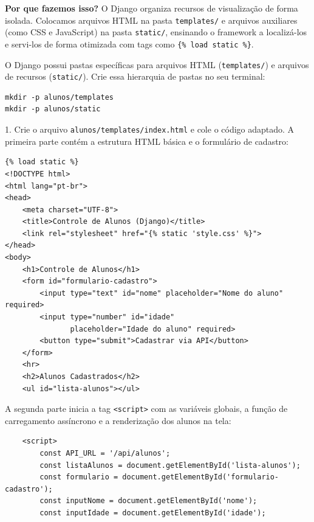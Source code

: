 \documentclass[12pt,a4paper]{article}
\begin{document}
\begin{boxAtividade}
\textbf{Por que fazemos isso?} O Django organiza recursos de visualização de forma isolada. Colocamos arquivos HTML na pasta \texttt{templates/} e arquivos auxiliares (como CSS e JavaScript) na pasta \texttt{static/}, ensinando o framework a localizá-los e servi-los de forma otimizada com tags como \texttt{\{\% load static \%\}}.

O Django possui pastas específicas para arquivos HTML (\texttt{templates/}) e arquivos de recursos (\texttt{static/}). Crie essa hierarquia de pastas no seu terminal:
\begin{boxCodigo}
\begin{verbatim}
mkdir -p alunos/templates
mkdir -p alunos/static
\end{verbatim}
\end{boxCodigo}

1. Crie o arquivo \texttt{alunos/templates/index.html} e cole o código adaptado. A primeira parte contém a estrutura HTML básica e o formulário de cadastro:
\begin{boxCodigo}
\begin{verbatim}
{% load static %}
<!DOCTYPE html>
<html lang="pt-br">
<head>
    <meta charset="UTF-8">
    <title>Controle de Alunos (Django)</title>
    <link rel="stylesheet" href="{% static 'style.css' %}">
</head>
<body>
    <h1>Controle de Alunos</h1>
    <form id="formulario-cadastro">
        <input type="text" id="nome" placeholder="Nome do aluno" required>
        <input type="number" id="idade" 
               placeholder="Idade do aluno" required>
        <button type="submit">Cadastrar via API</button>
    </form>
    <hr>
    <h2>Alunos Cadastrados</h2>
    <ul id="lista-alunos"></ul>
\end{verbatim}
\end{boxCodigo}

\vspace{0.3cm}
A segunda parte inicia a tag \texttt{<script>} com as variáveis globais, a função de carregamento assíncrono e a renderização dos alunos na tela:
\begin{boxCodigo}
\begin{verbatim}
    <script>
        const API_URL = '/api/alunos';
        const listaAlunos = document.getElementById('lista-alunos');
        const formulario = document.getElementById('formulario-cadastro');
        const inputNome = document.getElementById('nome');
        const inputIdade = document.getElementById('idade');


\end{verbatim}
\end{boxCodigo}
\end{boxAtividade}
\end{document}
